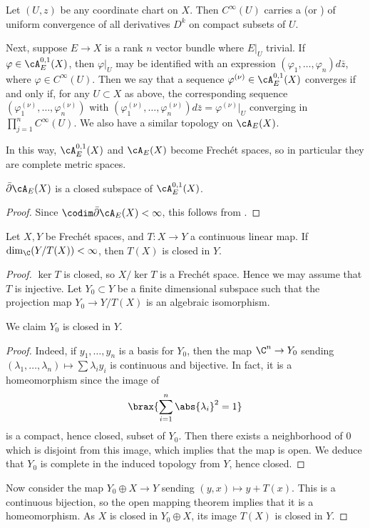 \documentclass[11pt]{report}
\begin{document}
\begin{rmk}
Let $(U,z)$ be any coordinate chart on $X$. Then $C^\infty (U)$ carries a  (or ) of uniform convergence of all derivatives $D^k$ on compact subsets of $U$.

Next, suppose $E\to X$ is a rank $n$ vector bundle where $E|_U$ trivial. If $\varphi \in \cA_E^{0,1}(X)$, then $\varphi|_U$ may be identified with an expression $(\varphi_1,\dots,\varphi_n)d\bar z$, where $\varphi \in C^\infty (U)$. Then we say that a sequence $\varphi^{(\nu)} \in \cA_E^{0,1}(X)$ converges if and only if, for any $U \subset X$ as above, the corresponding sequence $(\varphi_1^{(\nu)},\dots,\varphi_n^{(\nu)})$ with $(\varphi_1^{(\nu)},\dots,\varphi_n^{(\nu)})d\bar z = \varphi^{(\nu)}|_U$ converging in $\prod_{j=1}^nC^\infty (U)$. We also have a similar topology on $\cA_E(X)$.

In this way, $\cA_E^{0,1}(X)$ and $\cA_E(X)$ become Frech\'{e}t spaces, so in particular they are complete metric spaces.
\end{rmk}

\begin{thm}
$\bar \partial \cA_E(X)$ is a closed subspace of $\cA_E^{0,1}(X)$.
\end{thm}
\begin{proof}
Since $\codim \bar \partial \cA_E(X)<\infty$, this follows from .
\end{proof}
\begin{prop} \label{prop:frechet-func-anal}
Let $X,Y$ be Frech\'{e}t spaces, and $T:X \to Y$ a continuous linear map. If $\dim _\C(Y/T(X))<\infty$, then $T(X)$ is closed in $Y$.
\end{prop}

\begin{proof}
$\ker T$ is closed, so $X/\ker T$ is a Frech\'{e}t space. Hence we may assume that $T$ is injective. Let $Y_0 \subset Y$ be a finite dimensional subspace such that the projection map $Y_0 \to Y/T(X)$ is an algebraic isomorphism.
\begin{claim}
We claim $Y_0$ is closed in $Y$.
\end{claim}
\begin{proof}
Indeed, if $y_1,\dots,y_n$ is a basis for $Y_0$, then the map $\C^n \to Y_0$ sending $(\lambda_1,\dots,\lambda_n) \mapsto \sum \lambda _iy_i$ is continuous and bijective. In fact, it is a homeomorphism since the image of
\[
\brax{\sum_{i=1}^n \abs{\lambda_i}^2=1}
\]
is a compact, hence closed, subset of $Y_0$. Then there exists a neighborhood of $0$ which is disjoint from this image, which implies that the map is open. We deduce that $Y_0$ is complete in the induced topology from $Y$, hence closed.
\end{proof}
Now consider the map $Y_0 \oplus X \to Y$ sending $(y,x) \mapsto y+T(x)$. This is a continuous bijection, so the open mapping theorem 
implies that it is a homeomorphism. As $X$ is closed in $Y_0 \oplus X$, its image $T(X)$ is closed in $Y$.
\end{proof}
\end{document}

